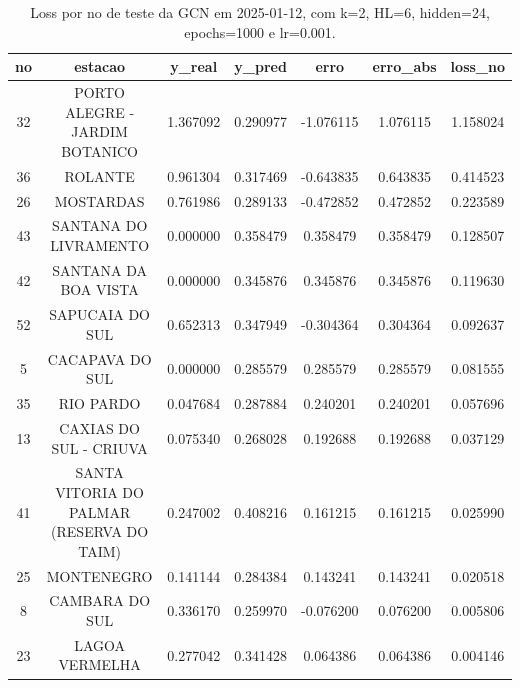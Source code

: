 \begin{table}[h]
\centering
\caption{Loss por no de teste da GCN em 2025-01-12, com k=2, HL=6, hidden=24, epochs=1000 e lr=0.001.}
\label{tab:gcn_loss_k2_hl6_h24_e1000_d20250112}
\begin{tabular}{ccccccc}
\toprule
no & estacao & y\_real & y\_pred & erro & erro\_abs & loss\_no \\
\midrule
32 & PORTO ALEGRE - JARDIM BOTANICO & 1.367092 & 0.290977 & -1.076115 & 1.076115 & 1.158024 \\
36 & ROLANTE & 0.961304 & 0.317469 & -0.643835 & 0.643835 & 0.414523 \\
26 & MOSTARDAS & 0.761986 & 0.289133 & -0.472852 & 0.472852 & 0.223589 \\
43 & SANTANA DO LIVRAMENTO & 0.000000 & 0.358479 & 0.358479 & 0.358479 & 0.128507 \\
42 & SANTANA DA BOA VISTA & 0.000000 & 0.345876 & 0.345876 & 0.345876 & 0.119630 \\
52 & SAPUCAIA DO SUL & 0.652313 & 0.347949 & -0.304364 & 0.304364 & 0.092637 \\
5 & CACAPAVA DO SUL & 0.000000 & 0.285579 & 0.285579 & 0.285579 & 0.081555 \\
35 & RIO PARDO & 0.047684 & 0.287884 & 0.240201 & 0.240201 & 0.057696 \\
13 & CAXIAS DO SUL - CRIUVA & 0.075340 & 0.268028 & 0.192688 & 0.192688 & 0.037129 \\
41 & SANTA VITORIA DO PALMAR (RESERVA DO TAIM) & 0.247002 & 0.408216 & 0.161215 & 0.161215 & 0.025990 \\
25 & MONTENEGRO & 0.141144 & 0.284384 & 0.143241 & 0.143241 & 0.020518 \\
8 & CAMBARA DO SUL & 0.336170 & 0.259970 & -0.076200 & 0.076200 & 0.005806 \\
23 & LAGOA VERMELHA & 0.277042 & 0.341428 & 0.064386 & 0.064386 & 0.004146 \\
\bottomrule
\end{tabular}
\end{table}
